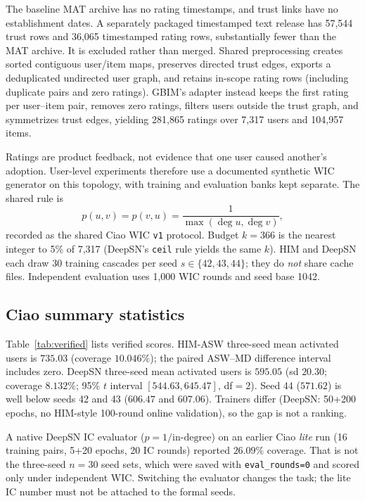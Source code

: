 \documentclass[10pt,twocolumn]{article}
\begin{document}
The baseline MAT archive has no rating timestamps, and trust links have no establishment dates. A separately packaged timestamped text release has 57,544 trust rows and 36,065 timestamped rating rows, substantially fewer than the MAT archive. It is excluded rather than merged. Shared preprocessing creates sorted contiguous user/item maps, preserves directed trust edges, exports a deduplicated undirected user graph, and retains in-scope rating rows (including duplicate pairs and zero ratings). GBIM's adapter instead keeps the first rating per user--item pair, removes zero ratings, filters users outside the trust graph, and symmetrizes trust edges, yielding 281,865 ratings over 7,317 users and 104,957 items.

Ratings are product feedback, not evidence that one user caused another's adoption. User-level experiments therefore use a documented synthetic WIC generator on this topology, with training and evaluation banks kept separate. The shared rule is
\begin{equation}
p(u,v)=p(v,u)=\frac{1}{\max(\deg u,\deg v)},
\end{equation}
recorded as the shared Ciao WIC \texttt{v1} protocol. Budget $k=366$ is the nearest integer to 5\% of 7,317 (DeepSN's \texttt{ceil} rule yields the same $k$). HIM and DeepSN each draw 30 training cascades per seed $s\in\{42,43,44\}$; they do \emph{not} share cache files. Independent evaluation uses 1,000 WIC rounds and seed base 1042.

\subsection{Ciao summary statistics}
Table~\ref{tab:verified} lists verified scores. HIM-ASW three-seed mean activated users is $735.03$ (coverage $10.046\%$); the paired ASW--MD difference interval includes zero. DeepSN three-seed mean activated users is $595.05$ (sd $20.30$; coverage $8.132\%$; 95\% $t$ interval $[544.63,645.47]$, df$=2$). Seed 44 ($571.62$) is well below seeds 42 and 43 ($606.47$ and $607.06$). Trainers differ (DeepSN: 50+200 epochs, no HIM-style 100-round online validation), so the gap is not a ranking.

A native DeepSN IC evaluator ($p=1/\mathrm{in\text{-}degree}$) on an earlier Ciao \emph{lite} run (16 training pairs, 5+20 epochs, 20 IC rounds) reported $26.09\%$ coverage. That is not the three-seed $n{=}30$ seed sets, which were saved with \texttt{eval\_rounds=0} and scored only under independent WIC. Switching the evaluator changes the task; the lite IC number must not be attached to the formal seeds.
\end{document}
